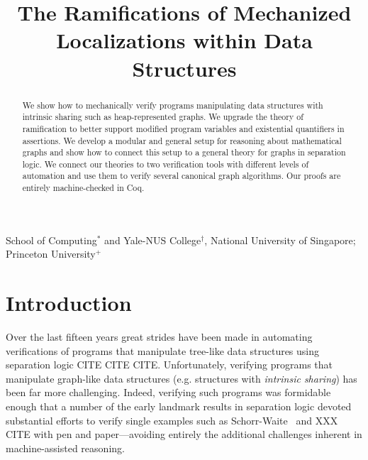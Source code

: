 \documentclass[pldi]{sigplanconf-pldi15}
\begin{document}
%
%

\title{The Ramifications of Mechanized Localizations within Data Structures}
{}
{School of Computing$^{*}$ and Yale-NUS College$^{\dagger}$, National University of Singapore; Princeton University$^{+}$}

\maketitle

\begin{abstract}
We show how to mechanically verify programs manipulating data structures with intrinsic sharing such as heap-represented graphs.  We upgrade the theory of ramification to better support modified program variables and existential quantifiers in assertions.  We develop a modular and general setup for reasoning about mathematical graphs and show
how to connect this setup to a general theory for graphs in separation logic.  We connect our theories to two verification tools with different levels of automation and use them to verify several canonical graph algorithms. Our proofs are entirely machine-checked in Coq.
\end{abstract}

\newcommand\hide[1]{}

\section{Introduction}
Over the last fifteen years great strides have been made in automating verifications of programs that manipulate
tree-like data structures using separation logic CITE CITE CITE.  Unfortunately, verifying programs that manipulate
graph-like data structures (e.g. structures with \emph{intrinsic sharing}) has been far more challenging.
Indeed, verifying such programs was formidable enough that a number of the early landmark results in separation logic
devoted substantial efforts to verify single examples such as Schorr-Waite~\cite{hongseok:phd} and XXX CITE with pen and
paper---avoiding entirely the additional challenges inherent in machine-assisted reasoning.
\end{document}
